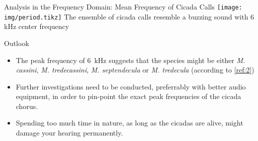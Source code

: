 \documentclass[english]{article}
\def\boxheight{200mm}
\def\boxsep{6mm}
\begin{document}
	\vskip\boxsep
	\begin{boxgray2w}[\boxheight]{Analysis in the Frequency Domain: Mean Frequency of Cicada Calls}{}
		\texttt{[image: img/period.tikz]}
		The ensemble of cicada calls resemble a buzzing sound with 6 kHz center frequency
	\end{boxgray2w}
	\begin{boxgrayw}[\boxheight]{Outlook}{}
		\begin{itemize}
			\item The peak frequency of \SI{6}{\kilo \hertz} suggests that the species might be either \textit{M. cassini}, \textit{M. tredecassini}, \textit{M. septendecula} or \textit{M. tredecula} (according to \ref{ref:2})
            \item Further investigations need to be conducted, preferrably with better audio equipment, in order to pin-point the exact peak frequencies of the cicada chorus.
            \item Spending too much time in nature, as long as the cicadas are alive, might damage your hearing permanently.
		\end{itemize}
	\end{boxgrayw}
\end{document}
